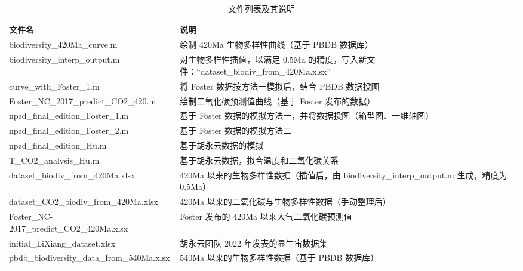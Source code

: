 \documentclass{article}
\begin{document}
\begin{table}[ht]
\centering
\begin{tabularx}{\textwidth}{X p{}}
\toprule
\textbf{文件名} & \textbf{说明} \\
\midrule
biodiversity_420Ma_curve.m & 绘制 420Ma 生物多样性曲线（基于 PBDB 数据库） \\
biodiversity_interp_output.m & 对生物多样性插值，以满足 0.5Ma 的精度，写入新文件：“dataset_biodiv_from_420Ma.xlsx” \\
curve_with_Foster_1.m & 将 Foster 数据按方法一模拟后，结合 PBDB 数据投图 \\
Foster_NC_2017_predict_CO2_420.m & 绘制二氧化碳预测值曲线（基于 Foster 发布的数据） \\
npzd_final_edition_Foster_1.m & 基于 Foster 数据的模拟方法一，并将数据投图（箱型图、一维轴图） \\
npzd_final_edition_Foster_2.m & 基于 Foster 数据的模拟方法二 \\
npzd_final_edition_Hu.m & 基于胡永云数据的模拟 \\
T_CO2_analysis_Hu.m & 基于胡永云数据，拟合温度和二氧化碳关系 \\
dataset_biodiv_from_420Ma.xlsx & 420Ma 以来的生物多样性数据（插值后，由 biodiversity_interp_output.m 生成，精度为 0.5Ma） \\
dataset_CO2_biodiv_from_420Ma.xlsx & 420Ma 以来的二氧化碳与生物多样性数据（手动整理后） \\
Foster_NC-2017_predict_CO2_420Ma.xlsx & Foster 发布的 420Ma 以来大气二氧化碳预测值 \\
initial_LiXiang_dataset.xlsx & 胡永云团队 2022 年发表的显生宙数据集 \\
pbdb_biodiversity_data_from_540Ma.xlsx & 540Ma 以来的生物多样性数据（基于 PBDB 数据库） \\
\bottomrule
\end{tabularx}
\caption{文件列表及其说明}
\label{tab:file_list}
\end{table}
\end{document}
